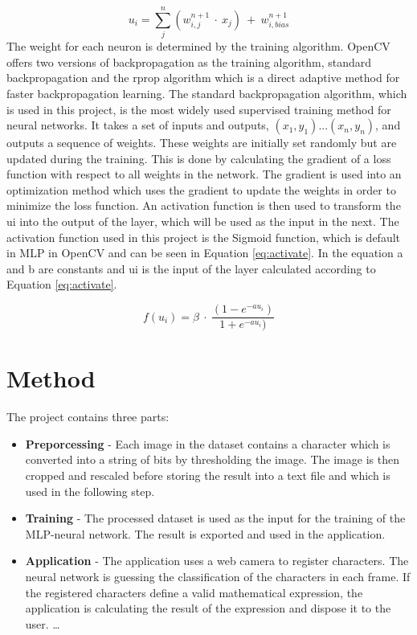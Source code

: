 \documentclass[12pt]{report}
\begin{document}
\begin{equation}
  \label{eq:weight}
  u_i = \sum_j^n (w_{i,j}^{n+1} \ \cdot \ x_j) \ + \ w_{i,bias}^{n+1}
\end{equation}
The weight for each neuron is determined by the training algorithm. OpenCV offers two versions of backpropagation as the training algorithm, standard backpropagation and the rprop algorithm which is a direct adaptive method for faster backpropagation learning. The standard backpropagation algorithm, which is used in this project, is the most widely used supervised training method for neural networks. It takes a set of inputs and outputs, $(x_1, y_1)...(x_n,y_n)$, and outputs a sequence of weights. These weights are initially set randomly but are updated during the training. This is done by calculating the gradient of a loss function with respect to all weights in the network. The gradient is used into an optimization method which uses the gradient to update the weights in order to minimize the loss function. 
\newline
\newline
An activation function is then used to transform the ui into the output of the layer, which will be used as the input in the next. The activation function used in this project is the Sigmoid function, which is default in MLP in OpenCV and can be seen in Equation \ref{eq:activate}. In the equation a and b are constants and ui is the input of the layer calculated according to Equation \ref{eq:activate}.


\begin{equation}
  \label{eq:activate}
  f(u_i) = \beta \ \cdot \ \frac{(1-e^{-au_i})}{1+e^{-au_i})}
\end{equation}



\section*{Method}

The project contains three parts:

\begin{itemize}  
\item \textbf{Preporcessing} -  Each image in the dataset contains a character which is converted into a string of bits by thresholding the image. The image is then cropped and rescaled before storing the result into a text file and which is used in the following step. 
\item \textbf{Training} - The processed dataset is used as the input for the training of the MLP-neural network. The result is exported and used in the application.
\item \textbf{Application} - The application uses a web camera to register characters. The neural network is guessing the classification of the characters in each frame. If the registered characters define a valid mathematical expression, the application is calculating the result of the expression and dispose it to the user. \ldots 
\end{itemize}
\end{document}
